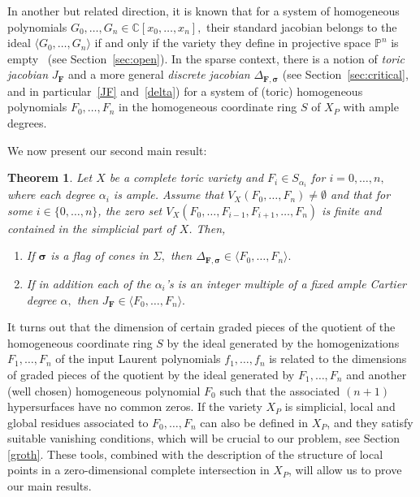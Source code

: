 \documentclass[a4paper,11pt]{amsart}
\newcommand{\C}{\mathbb{C}}
\renewcommand{\P}{\mathbb{P}}
\newcommand{\bfsigma}{{\boldsymbol{\sigma}}}
\newcommand{\bfF}{{\boldsymbol{F}}}
\newcounter{thm}
\numberwithin{thm}{section}
\numberwithin{equation}{section}
\theoremstyle{definition}
\theoremstyle{plain}
\newtheorem{theorem}[thm]{Theorem}
\begin{document}
\smallskip

 In another but related direction, it is known that for a system of homogeneous polynomials $G_0,\ldots, G_n\in\C[x_0,\ldots, x_n],$ their standard jacobian belongs to the ideal $\langle G_0,\ldots, G_n\rangle$ if and only if the variety they define in projective space $\P^n$ is empty~\cite{spo89,vas92} (see Section~\ref{sec:open}). In the sparse context, there is a notion of \textit{toric jacobian}  $J_\bfF$ and a more general \textit{discrete jacobian} $\Delta_{\bfF,\bfsigma}$ (see Section~\ref{sec:critical}, and in particular~\eqref{JF} and~\eqref{delta}) for a system of (toric) homogeneous polynomials $F_0,\ldots, F_n$ in the homogeneous coordinate ring $S$ of $X_P$ with ample degrees.
 
 We now present our second main result:
 
 \begin{theorem}\label{fonlyif}
Let $X$ be a complete toric variety and $F_i\in S_{\alpha_i}$ for $i=0,\ldots, n,$ where each degree $\alpha_i$ is ample. Assume that $V_X(F_0,\ldots, F_n)\neq\emptyset$ and
that  for some $i\in\{0,\ldots, n\}$, the zero set $V_X(F_0,\ldots, F_{i-1}, F_{i+1},\ldots, F_n)$ is finite and contained in the simplicial part of $X$. Then,
\begin{enumerate}
\item If $\bfsigma$ is a flag of cones in $\Sigma,$  then $\Delta_{\bfF,\bfsigma}\in \langle F_0,\ldots, F_n\rangle.$
\item If in addition each of the $\alpha_i$'s is an integer multiple of a fixed ample Cartier degree  $\alpha,$ then  $J_\bfF\in \langle F_0,\ldots, F_n\rangle.$
\end{enumerate}
\end{theorem}

 It turns out that the dimension of certain graded pieces of the quotient of the homogeneous coordinate ring $S$   by the ideal generated by the homogenizations  $F_1, \dots, F_n$ of
the input Laurent polynomials $f_1, \dots, f_n$ is related to the  dimensions of  graded pieces of the quotient by the ideal generated by $F_1, \dots, F_n$ and another (well chosen) homogeneous polynomial $F_0$ such that the associated $(n+1)$ hypersurfaces have no common zeros. If the variety $X_P$ is simplicial, local and global residues associated to $F_0, \dots, F_n$  can also be defined in $X_P$, and they satisfy suitable vanishing conditions, which will be crucial to our problem, see Section \ref{groth}.   These tools, combined with the description of the structure of local points in a zero-dimensional complete intersection in $X_P$, will allow us to prove our main results.
\end{document}
